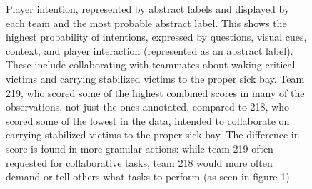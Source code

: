 \begin{figure}[h!]
    \centering
    \caption{%
        Player intention, represented by abstract labels and displayed by each
        team and the most probable abstract label. This shows the highest
        probability of intentions, expressed by questions, visual cues,
        context, and player interaction (represented as an abstract label).
        These include collaborating with teammates about waking critical
        victims and carrying stabilized victims to the proper sick bay. Team
        219, who scored some of the highest combined scores in many of the
        observations, not just the ones annotated, compared to 218, who scored
        some of the lowest in the data, intended to collaborate on carrying
        stabilized victims to the proper sick bay. The difference in score is
        found in more granular actions: while team 219 often requested for
        collaborative tasks, team 218 would more often demand or tell others
        what tasks to perform (as seen in figure 1).
    }
\end{figure}

